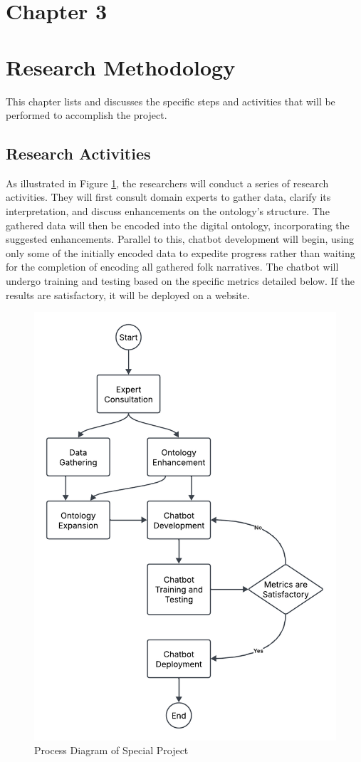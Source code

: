 \section*{Chapter 3}
\section{Research Methodology}
This chapter lists and discusses the specific steps and activities that will be performed  to accomplish the project. 

\subsection{Research Activities}

As illustrated in Figure \ref{fig:process diagram}, the researchers will conduct a series of research activities. They will first consult domain experts to gather data, clarify its interpretation, and discuss enhancements on the ontology’s structure. The gathered data will then be encoded into the digital ontology, incorporating the suggested enhancements. Parallel to this, chatbot development will begin, using only some of the initially encoded data to expedite progress rather than waiting for the completion of encoding all gathered folk narratives. The chatbot will undergo training and testing based on the specific metrics detailed below. If the results are satisfactory, it will be deployed on a website.

\begin{figure}[H]
    \centering
    \includegraphics[width=0.8\linewidth]{figures/Process Diagram of Special Project.png}
    \caption{Process Diagram of Special Project}
    \label{fig:process diagram}
\end{figure}

